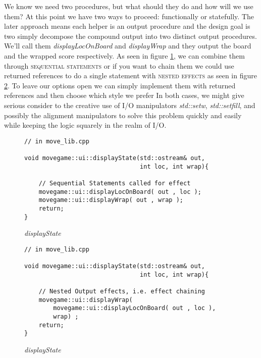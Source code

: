 \documentclass[nobib]{tufte-handout}
\begin{document}
We know we need two procedures, but what should they do and how will we use them?  At this point we have two ways to proceed: functionally or statefully. The later approach means each helper is an output procedure and the design goal is two simply decompose the compound output into two distinct output procedures. We'll call them \textit{displayLocOnBoard} and \textit{displayWrap} and they output the board and the wrapped score respectively. As seen in figure \ref{fig:display-twoOut}, we can combine them through \textsc{sequential statements} or if you want to chain them we could use returned references to do a single statement with \textsc{nested effects} as seen in figure \ref{fig:display-twoOut-chained}. To leave our options open we can simply implement them with returned references and then choose which style we prefer In both cases, we might give serious consider to the creative use of I/O manipulators \textit{std::setw}, \textit{std::setfill}, and possibly the alignment manipulators to solve this problem quickly and easily while keeping the logic squarely in the realm of I/O. 
 
\begin{figure}[!htbp]
\begin{lstlisting}
// in move_lib.cpp

void movegame::ui::displayState(std::ostream& out,
	                            int loc, int wrap){

	// Sequential Statements called for effect
	movegame::ui::displayLocOnBoard( out , loc );                            
	movegame::ui::displayWrap( out , wrap );
	return;	                            
}	       

\end{lstlisting}
\caption{\textit{displayState} }
\label{fig:display-twoOut}
\end{figure}

\begin{figure}[!htbp]
\begin{lstlisting}
// in move_lib.cpp

void movegame::ui::displayState(std::ostream& out,
	                            int loc, int wrap){

	// Nested Output effects, i.e. effect chaining
	movegame::ui::displayWrap( 
		movegame::ui::displayLocOnBoard( out , loc ),
		wrap) ;                            
	return;	                            
}	       

\end{lstlisting}
\caption{\textit{displayState} }
\label{fig:display-twoOut-chained}
\end{figure}
\end{document}
